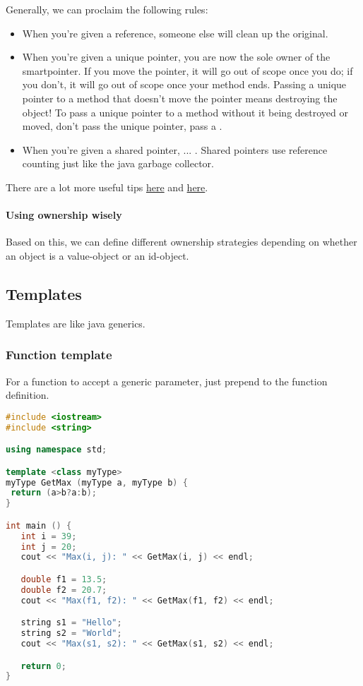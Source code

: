 Generally, we can proclaim the following rules:
\begin{itemize}
    \item When you're given a reference, someone else will clean up the original. 
    \item When you're given a unique pointer, you are now the sole owner of the smartpointer. If you move the pointer, it will go out of scope once you do; if you don't, it will go out of scope once your method ends. Passing a unique pointer to a method that doesn't move the pointer means destroying the object! To pass a unique pointer to a method without it being destroyed or moved, don't pass the unique pointer, pass a .
    \item When you're given a shared pointer, ... . Shared pointers use reference counting just like the java garbage collector.  
\end{itemize}
There are a lot more useful tips \hyperlink{https://herbsutter.com/2013/06/05/gotw-91-solution-smart-pointer-parameters/}{here} and \hyperlink{https://stackoverflow.com/questions/8114276/how-do-i-pass-a-unique-ptr-argument-to-a-constructor-or-a-function}{here}.


\paragraph{Using ownership wisely} Based on this, we can define different ownership strategies depending on whether an object is a value-object or an id-object. 


\subsection{Templates}
Templates are like java generics. 

\subsubsection{Function template}

For a function to accept a generic parameter, just prepend  to the function definition. 

\begin{lstlisting}[language=c++]
#include <iostream>
#include <string>

using namespace std;

template <class myType>
myType GetMax (myType a, myType b) {
 return (a>b?a:b);
}

int main () {
   int i = 39;
   int j = 20;
   cout << "Max(i, j): " << GetMax(i, j) << endl; 

   double f1 = 13.5; 
   double f2 = 20.7; 
   cout << "Max(f1, f2): " << GetMax(f1, f2) << endl; 

   string s1 = "Hello"; 
   string s2 = "World"; 
   cout << "Max(s1, s2): " << GetMax(s1, s2) << endl; 

   return 0;
}
\end{lstlisting}



